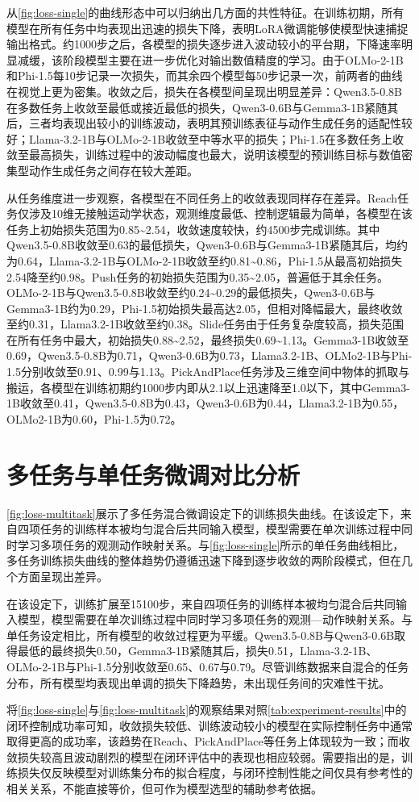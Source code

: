 从\cref{fig:loss-single}的曲线形态中可以归纳出几方面的共性特征。在训练初期，所有模型在所有任务中均表现出迅速的损失下降，表明LoRA微调能够使模型快速捕捉输出格式。约1000步之后，各模型的损失逐步进入波动较小的平台期，下降速率明显减缓，该阶段模型主要在进一步优化对输出数值精度的学习。由于OLMo-2-1B和Phi-1.5每10步记录一次损失，而其余四个模型每50步记录一次，前两者的曲线在视觉上更为密集。收敛之后，损失在各模型间呈现出明显差异：Qwen3.5-0.8B在多数任务上收敛至最低或接近最低的损失，Qwen3-0.6B与Gemma3-1B紧随其后，三者均表现出较小的训练波动，表明其预训练表征与动作生成任务的适配性较好；Llama-3.2-1B与OLMo-2-1B收敛至中等水平的损失；Phi-1.5在多数任务上收敛至最高损失，训练过程中的波动幅度也最大，说明该模型的预训练目标与数值密集型动作生成任务之间存在较大差距。

从任务维度进一步观察，各模型在不同任务上的收敛表现同样存在差异。Reach任务仅涉及10维无接触运动学状态，观测维度最低、控制逻辑最为简单，各模型在该任务上初始损失范围为0.85\textasciitilde2.54，收敛速度较快，约4500步完成训练。其中Qwen3.5-0.8B收敛至0.63的最低损失，Qwen3-0.6B与Gemma3-1B紧随其后，均约为0.64，Llama-3.2-1B与OLMo-2-1B收敛至约0.81\textasciitilde0.86，Phi-1.5从最高初始损失2.54降至约0.98。Push任务的初始损失范围为0.35\textasciitilde2.05，普遍低于其余任务。OLMo-2-1B与Qwen3.5-0.8B收敛至约0.24\textasciitilde0.29的最低损失，Qwen3-0.6B与Gemma3-1B约为0.29，Phi-1.5初始损失最高达2.05，但相对降幅最大，最终收敛至约0.31，Llama3.2-1B收敛至约0.38。Slide任务由于任务复杂度较高，损失范围在所有任务中最大，初始损失0.88\textasciitilde2.52，最终损失0.69\textasciitilde1.13。Gemma3-1B收敛至0.69，Qwen3.5-0.8B为0.71，Qwen3-0.6B为0.73，Llama3.2-1B、OLMo2-1B与Phi-1.5分别收敛至0.91、0.99与1.13。PickAndPlace任务涉及三维空间中物体的抓取与搬运，各模型在训练初期约1000步内即从2.1以上迅速降至1.0以下，其中Gemma3-1B收敛至0.41，Qwen3.5-0.8B为0.43，Qwen3-0.6B为0.44，Llama3.2-1B为0.55，OLMo2-1B为0.60，Phi-1.5为0.72。

\section{多任务与单任务微调对比分析}

\cref{fig:loss-multitask}展示了多任务混合微调设定下的训练损失曲线。在该设定下，来自四项任务的训练样本被均匀混合后共同输入模型，模型需要在单次训练过程中同时学习多项任务的观测动作映射关系。与\cref{fig:loss-single}所示的单任务曲线相比，多任务训练损失曲线的整体趋势仍遵循迅速下降到逐步收敛的两阶段模式，但在几个方面呈现出差异。

在该设定下，训练扩展至15100步，来自四项任务的训练样本被均匀混合后共同输入模型，模型需要在单次训练过程中同时学习多项任务的观测—动作映射关系。与单任务设定相比，所有模型的收敛过程更为平缓。Qwen3.5-0.8B与Qwen3-0.6B取得最低的最终损失0.50，Gemma3-1B紧随其后，损失0.51，Llama-3.2-1B、OLMo-2-1B与Phi-1.5分别收敛至0.65、0.67与0.79。尽管训练数据来自混合的任务分布，所有模型均表现出单调的损失下降趋势，未出现任务间的灾难性干扰。

将\cref{fig:loss-single}与\cref{fig:loss-multitask}的观察结果对照\cref{tab:experiment-results}中的闭环控制成功率可知，收敛损失较低、训练波动较小的模型在实际控制任务中通常取得更高的成功率，该趋势在Reach、PickAndPlace等任务上体现较为一致；而收敛损失较高且波动剧烈的模型在闭环评估中的表现也相应较弱。需要指出的是，训练损失仅反映模型对训练集分布的拟合程度，与闭环控制性能之间仅具有参考性的相关关系，不能直接等价，但可作为模型选型的辅助参考依据。